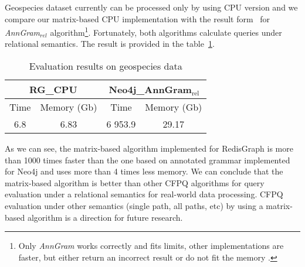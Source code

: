 Geospecies dataset currently can be processed only by using CPU version and we compare our matrix-based CPU implementation with the result form~\cite{Kuijpers:2019:ESC:3335783.3335791} for \textit{AnnGram$_{\textit{rel}}$} algorithm\footnote{Only \textit{AnnGram} works correctly and fits limits, other implementations are faster, but either return an incorrect result or do not fit the memory .}.
Fortunately, both algorithms calculate queries under relational semantics.
The result is provided in the table~\ref{tbl:geo}.

\begin{table}[H]
\caption{Evaluation results on geospecies data}
\label{tbl:geo}
\begin{tabular}{| c | c | c | c | }
    \hline
     \multicolumn{2}{|c|}{RG\_CPU}     & \multicolumn{2}{|c|}{Neo4j\_AnnGram$_{\text{rel}}$}          \\
     \hline
     Time  & Memory (Gb)  & Time  & Memory (Gb)   \\
    \hline
    \hline
    6.8   & 6.83    & 6 953.9  & 29.17   \\
    \hline
\end{tabular}
\end{table}

As we can see, the matrix-based algorithm implemented for RedisGraph is more than 1000 times faster than the one based on annotated grammar implemented for Neo4j and uses more than 4 times less memory.
We can conclude that the matrix-based algorithm is better than other CFPQ algorithms for query evaluation under a relational semantics for real-world data processing.
CFPQ evaluation under other semantics (single path, all paths, etc) by using a matrix-based algorithm is a direction for future research.

